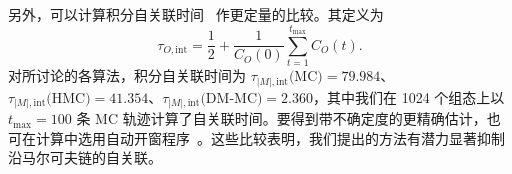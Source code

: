 {另外，可以计算积分自关联时间~\cite{Schaefer:2010hu,Pawlowski:2018qxs,DelDebbio:2021qwf} 作更定量的比较。其定义为
\begin{equation}
    \tau_{O,{\mathrm{int}}}={\frac{1}{2}}+{\frac{1}{C_{O}(0)}}\sum_{t=1}^{t_\text{max}}C_{O}(t).
\end{equation}
对所讨论的各算法，积分自关联时间为 $ \tau_{|M|,{\mathrm{int}}}\text{(MC)} = 79.984$、$\tau_{|M|,{\mathrm{int}}}\text{(HMC)} = 41.354$、$\tau_{|M|,{\mathrm{int}}}\text{(DM-MC)} = 2.360$，其中我们在 1024 个组态上以 $t_\text{max} = 100$ 条 MC 轨迹计算了自关联时间。要得到带不确定度的更精确估计，也可在计算中选用自动开窗程序~\cite{Wolff:2003sm,Joswig:2022qfe}。这些比较表明，我们提出的方法有潜力显著抑制沿马尔可夫链的自关联。}
